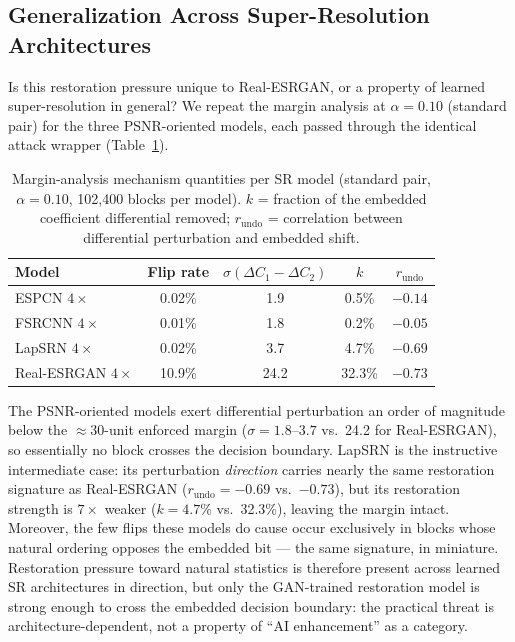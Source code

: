 \documentclass[conference]{IEEEtran}
\begin{document}
\subsection{Generalization Across Super-Resolution Architectures}
\label{sec:generalization}

Is this restoration pressure unique to Real-ESRGAN, or a property of
learned super-resolution in general? We repeat the margin analysis at
$\alpha = 0.10$ (standard pair) for the three PSNR-oriented models,
each passed through the identical attack wrapper
(Table~\ref{tab:mechanism}).

\begin{table}[t]
\caption{Margin-analysis mechanism quantities per SR model (standard
pair, $\alpha=0.10$, 102,400 blocks per model). $k$ = fraction of the
embedded coefficient differential removed; $r_{\mathrm{undo}}$ =
correlation between differential perturbation and embedded shift.}
\label{tab:mechanism}
\centering
\begin{tabular}{lcccc}
\toprule
Model & Flip rate & $\sigma(\Delta C_1{-}\Delta C_2)$ & $k$ & $r_{\mathrm{undo}}$ \\
\midrule
ESPCN $4\times$       & 0.02\% & 1.9  & 0.5\%  & $-0.14$ \\
FSRCNN $4\times$      & 0.01\% & 1.8  & 0.2\%  & $-0.05$ \\
LapSRN $4\times$      & 0.02\% & 3.7  & 4.7\%  & $-0.69$ \\
Real-ESRGAN $4\times$ & 10.9\% & 24.2 & 32.3\% & $-0.73$ \\
\bottomrule
\end{tabular}
\end{table}

The PSNR-oriented models exert differential perturbation an order of
magnitude below the $\approx$30-unit enforced margin
($\sigma = 1.8$--$3.7$ vs.\ 24.2 for Real-ESRGAN), so essentially no
block crosses the decision boundary. LapSRN is the instructive
intermediate case: its perturbation \emph{direction} carries nearly the
same restoration signature as Real-ESRGAN
($r_{\mathrm{undo}} = -0.69$ vs.\ $-0.73$), but its restoration
strength is $7\times$ weaker ($k = 4.7\%$ vs.\ 32.3\%), leaving the
margin intact. Moreover, the few flips these models do cause occur
exclusively in blocks whose natural ordering opposes the embedded bit
--- the same signature, in miniature. Restoration pressure toward
natural statistics is therefore present across learned SR
architectures in direction, but only the GAN-trained restoration model
is strong enough to cross the embedded decision boundary: the practical
threat is architecture-dependent, not a property of ``AI enhancement''
as a category.
\end{document}
